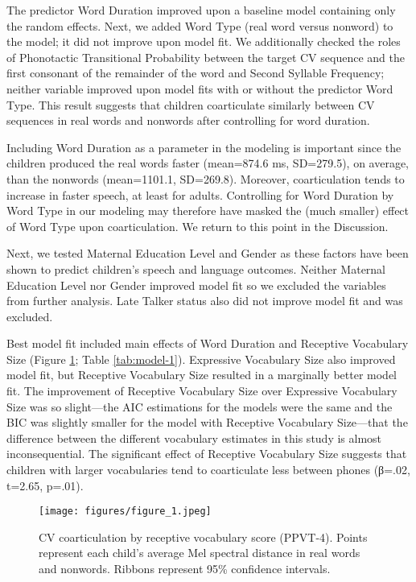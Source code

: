 \documentclass[a4paper,man,natbib,donotrepeattitle, apacite]{apa6}
\begin{document}
The predictor Word Duration improved upon a baseline model containing only the random effects. Next, we added Word Type (real word versus nonword) to the model; it did not improve upon model fit. We additionally checked the roles of Phonotactic Transitional Probability between the target CV sequence and the first consonant of the remainder of the word and Second Syllable Frequency; neither variable improved upon model fits with or without the predictor Word Type. This result suggests that children coarticulate similarly between CV sequences in real words and nonwords after controlling for word duration. 

Including Word Duration as a parameter in the modeling is important since the children produced the real words faster (mean=874.6 ms, SD=279.5), on average, than the nonwords (mean=1101.1, SD=269.8). Moreover, coarticulation tends to increase in faster speech, at least for adults. Controlling for Word Duration by Word Type in our modeling may therefore have masked the (much smaller) effect of Word Type upon coarticulation. We return to this point in the Discussion.    

Next, we tested Maternal Education Level and Gender as these factors have been shown to predict children’s speech and language outcomes. Neither Maternal Education Level nor Gender improved model fit so we excluded the variables from further analysis. Late Talker status also did not improve model fit and was excluded. 

Best model fit included main effects of Word Duration and Receptive Vocabulary Size (Figure \ref{fig:figure-1}; Table \ref{tab:model-1}). Expressive Vocabulary Size also improved model fit, but Receptive Vocabulary Size resulted in a marginally better model fit. The improvement of Receptive Vocabulary Size over Expressive Vocabulary Size was so slight---the AIC estimations for the models were the same and the BIC was slightly smaller for the model with Receptive Vocabulary Size---that the difference between the different vocabulary estimates in this study is almost inconsequential. The significant effect of Receptive Vocabulary Size suggests that children with larger vocabularies tend to coarticulate less between phones (β=.02, t=2.65,  p=.01). 

\begin{figure}[H]
\centering
\texttt{[image: figures/figure\_1.jpeg]}
\caption{\label{fig:figure-1}CV coarticulation by receptive vocabulary score (PPVT-4). Points represent each child's average Mel spectral distance in real words and nonwords. Ribbons represent 95\% confidence intervals.}
\end{figure}
\end{document}

